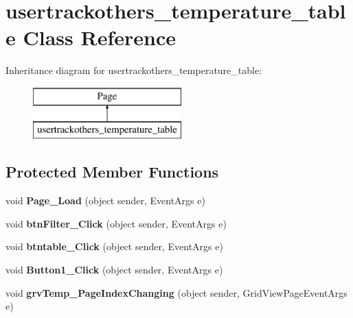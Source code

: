 \hypertarget{classusertrackothers__temperature__table}{\section{usertrackothers\-\_\-temperature\-\_\-table Class Reference}
\label{classusertrackothers__temperature__table}
}
Inheritance diagram for usertrackothers\-\_\-temperature\-\_\-table\-:\begin{figure}[H]
\begin{center}
\leavevmode
\includegraphics[height=2.000000cm]{classusertrackothers__temperature__table}
\end{center}
\end{figure}
\subsection*{Protected Member Functions}
\begin{DoxyCompactItemize}
\item 
\hypertarget{classusertrackothers__temperature__table_ae4a09be8e9a15582fd7d4786719957df}{void {\bfseries Page\-\_\-\-Load} (object sender, Event\-Args e)}\label{classusertrackothers__temperature__table_ae4a09be8e9a15582fd7d4786719957df}

\item 
\hypertarget{classusertrackothers__temperature__table_aa12aca5b409d8bf3a682d2fa4ff397fc}{void {\bfseries btn\-Filter\-\_\-\-Click} (object sender, Event\-Args e)}\label{classusertrackothers__temperature__table_aa12aca5b409d8bf3a682d2fa4ff397fc}

\item 
\hypertarget{classusertrackothers__temperature__table_a3ff0c01488d4e2b9d79fd0b1241d805b}{void {\bfseries btntable\-\_\-\-Click} (object sender, Event\-Args e)}\label{classusertrackothers__temperature__table_a3ff0c01488d4e2b9d79fd0b1241d805b}

\item 
\hypertarget{classusertrackothers__temperature__table_ab47ef6d90130c199f4ffdbe8cc76463c}{void {\bfseries Button1\-\_\-\-Click} (object sender, Event\-Args e)}\label{classusertrackothers__temperature__table_ab47ef6d90130c199f4ffdbe8cc76463c}

\item 
\hypertarget{classusertrackothers__temperature__table_a7bc980b8ec5de3287548b89dcf55014c}{void {\bfseries grv\-Temp\-\_\-\-Page\-Index\-Changing} (object sender, Grid\-View\-Page\-Event\-Args e)}\label{classusertrackothers__temperature__table_a7bc980b8ec5de3287548b89dcf55014c}

\end{DoxyCompactItemize}


